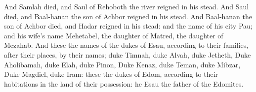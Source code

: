 {And
Samlah
died, and
Saul of
Rehoboth
{} the
river
reigned in his stead.
And
Saul
died, and
Baal-hanan the
son of
Achbor
reigned in his stead.
And
Baal-hanan the
son of
Achbor
died, and
Hadar
reigned in his stead: and the
name of his
city
{}
Pau; and his
wife’s
name
{}
Mehetabel, the
daughter of
Matred, the
daughter of
Mezahab.
And these
{} the
names of the
dukes
{} of
Esau, according to their
families, after their
places, by their
names;
duke
Timnah,
duke
Alvah,
duke
Jetheth,
Duke
Aholibamah,
duke
Elah,
duke
Pinon,
Duke
Kenaz,
duke
Teman,
duke
Mibzar,
Duke
Magdiel,
duke
Iram: these
{} the
dukes of
Edom, according to their
habitations in the
land of their
possession: he
{}
Esau the
father of the
Edomites.

}
